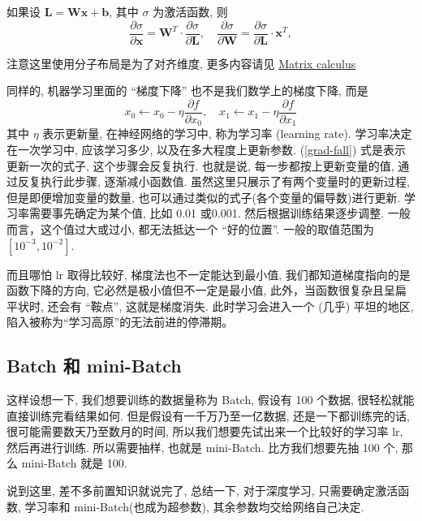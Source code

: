 如果设 $ \mathbf{L} = \mathbf{W} \mathbf{x} + \mathbf{b} $, 其中  $ \sigma $ 为激活函数, 则 
\begin{equation}
    \frac{\partial \sigma}{\partial \mathbf{x}} = \mathbf{W}^{T} \cdot \frac{\partial \sigma}{\partial \mathbf{L}},  
    \quad
    \frac{\partial \sigma}{\partial \mathbf{W}} =\frac{\partial \sigma}{\partial \mathbf{L}} \cdot \mathbf{x}^{T},  
\end{equation}
\begin{remark}
    注意这里使用分子布局是为了对齐维度, 更多内容请见 \href{https://en.wikipedia.org/wiki/Matrix_calculus}{Matrix calculus}
\end{remark}
同样的, 机器学习里面的 ``梯度下降'' 也不是我们数学上的梯度下降, 而是
\begin{equation}
    x_0 \leftarrow x_0 - \eta \frac{\partial f}{\partial x_0}, \quad x_1 \leftarrow x_1 - \eta \frac{\partial f}{\partial x_1}
    \label{grad-fall}
\end{equation}
其中 $ \eta $ 表示更新量, 在神经网络的学习中, 称为学习率 (learning rate). 学习率决定在一次学习中, 应该学习多少, 以及在多大程度上更新参数. (\ref{grad-fall}) 式是表示更新一次的式子, 这个步骤会反复执行. 也就是说, 每一步都按上更新变量的值, 通过反复执行此步骤, 逐渐减小函数值. 虽然这里只展示了有两个变量时的更新过程, 但是即便增加变量的数量, 也可以通过类似的式子(各个变量的偏导数)进行更新. 学习率需要事先确定为某个值, 比如 0.01 或0.001. 然后根据训练结果逐步调整. 一般而言，这个值过大或过小, 都无法抵达一个 ``好的位置''. 一般的取值范围为 $ [10^{-3}, 10^{-2} ] $. 

而且哪怕 lr 取得比较好, 梯度法也不一定能达到最小值, 我们都知道梯度指向的是函数下降的方向, 它必然是极小值但不一定是最小值, 此外，当函数很复杂且呈扁平状时, 还会有 ``鞍点'', 这就是梯度消失. 此时学习会进入一个 (几乎) 平坦的地区, 陷入被称为“学习高原”的无法前进的停滞期。

\subsection{Batch 和 mini-Batch}
这样设想一下, 我们想要训练的数据量称为 Batch, 假设有 100 个数据, 很轻松就能直接训练完看结果如何. 但是假设有一千万乃至一亿数据, 还是一下都训练完的话, 很可能需要数天乃至数月的时间, 所以我们想要先试出来一个比较好的学习率 lr, 然后再进行训练. 所以需要抽样, 也就是 mini-Batch. 比方我们想要先抽 100 个, 那么 mini-Batch 就是 100. 

说到这里, 差不多前置知识就说完了, 总结一下, 对于深度学习, 只需要确定激活函数, 学习率和 mini-Batch(也成为超参数), 其余参数均交给网络自己决定. 

